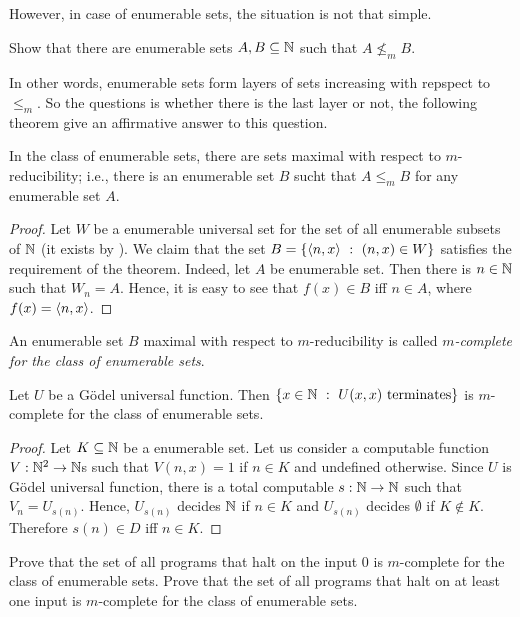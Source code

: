 However, in case of enumerable sets, the situation is not that simple.
\begin{exercise}
  Show that there are enumerable sets $A, B \subseteq {\mathbb{N}}$ such that $A \not\le_m
  B$.
\end{exercise}

In other words, enumerable sets form layers of sets increasing with repspect to
$\le_m$. So the questions is whether there is the last layer or not, the
following theorem give an affirmative answer to this question.
\begin{theorem}
  In the class of enumerable sets, there are sets maximal with respect to
  $m$-reducibility; i.e., there is an enumerable set $B$ sucht that $A \le_m B$
  for any enumerable set $A$.
\end{theorem}
\begin{proof}
  Let $W$ be a enumerable universal set for the set of all enumerable subsets of
  ${\mathbb{N}}$ (it exists by ). 
  We claim that the set $B = \set[(n, x) \in W]{\pair{n}{x}}$ satisfies the
  requirement of the theorem. Indeed, let $A$ be enumerable set. Then there is
  $n \in {\mathbb{N}}$ such that $W_n = A$. Hence, it is easy to see that $f(x) \in B$ iff 
  $n \in A$, where $f(x) = \langle {n}, {x} \rangle$.
\end{proof}

\begin{definition}
  An enumerable set $B$ maximal with respect to $m$-reducibility is called
  \emph{$m$-complete for the class of enumerable sets}.
\end{definition}

\begin{theorem}
\label{theorem:m-complete-enumerable}
  Let $U$ be a G\"odel universal function. 
  Then $\set[U(x, x) \text{ terminates}]{x \in \N}$ is $m$-complete for the
  class of enumerable sets.
\end{theorem}
\begin{proof}
  Let $K \subseteq {\mathbb{N}}$ be a enumerable set. Let us consider a computable
  function $V : {\mathbb{N}}^2 \to {\mathbb{N}}$s such that $V(n, x) = 1$ if $n \in K$ and undefined
  otherwise. Since $U$ is G\"odel universal function, there is a total
  computable $s : {\mathbb{N}} \to {\mathbb{N}}$ such that $V_n = U_{s(n)}$. Hence,  $U_{s(n)}$
  decides ${\mathbb{N}}$ if $n \in K$ and $U_{s(n)}$ decides $\emptyset$ if $K \not\in K$.
  Therefore $s(n) \in D$ iff $n \in K$.
\end{proof}

\begin{chapterendexercises}
  \exercise Prove that the set of all programs that halt on the input $0$ is
    $m$-complete for the class of enumerable sets.
  \exercise Prove that the set of all programs that halt on at least one input
  is $m$-complete for the class of enumerable sets.
\end{chapterendexercises}
